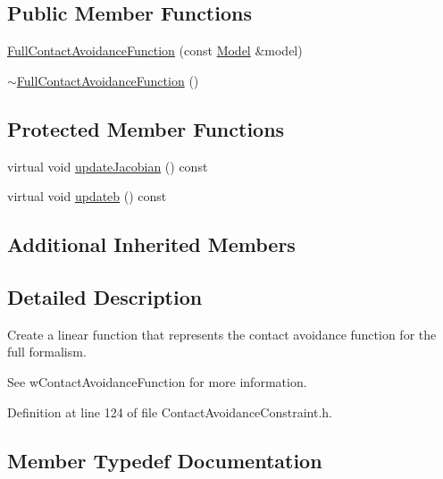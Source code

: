 \subsection*{Public Member Functions}
\begin{DoxyCompactItemize}
\item 
\hyperlink{classocra_1_1FullContactAvoidanceFunction_aa1632bec7158003ab2da17f71aa134e0}{Full\+Contact\+Avoidance\+Function} (const \hyperlink{classocra_1_1Model}{Model} \&model)
\item 
\hyperlink{classocra_1_1FullContactAvoidanceFunction_abf414a050f3b16c4a095049937335c96}{$\sim$\+Full\+Contact\+Avoidance\+Function} ()
\end{DoxyCompactItemize}
\subsection*{Protected Member Functions}
\begin{DoxyCompactItemize}
\item 
virtual void \hyperlink{classocra_1_1FullContactAvoidanceFunction_a3c2af64d4975ee6f0c148dc41eb334d8}{update\+Jacobian} () const 
\item 
virtual void \hyperlink{classocra_1_1FullContactAvoidanceFunction_a24ce7af1eec493b992566ee36c0abd2e}{updateb} () const 
\end{DoxyCompactItemize}
\subsection*{Additional Inherited Members}


\subsection{Detailed Description}
Create a linear function that represents the contact avoidance function for the full formalism. 

See w\+Contact\+Avoidance\+Function for more information. 

Definition at line 124 of file Contact\+Avoidance\+Constraint.\+h.



\subsection{Member Typedef Documentation}
